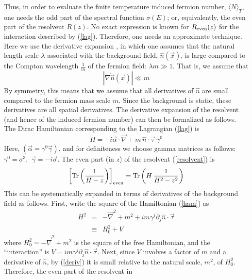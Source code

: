 \documentclass[a4paper,prd]{revtex4}
\begin{document}
Thus, in order to evaluate the finite temperature induced fermion
number,
$\langle N\rangle_T$, one needs the odd part of the spectral function
$\sigma(E)$; or, equivalently, the even part of the resolvent $ R(z)$. No
exact expression is known for 
$R_{\rm even}(z)$ for the interaction described by (\ref{lag}).
Therefore, one needs an approximate technique. Here we use the
derivative expansion \cite{ian}, in which one assumes that the natural
length scale $\lambda$ associated with the background field,
$\hat{n}(\vec{x})$, is large compared to the Compton wavelength
$\frac{1}{m}$ of the fermion field: $\lambda m \gg 1$. That is, we
assume that
\begin{equation}
|\vec{\nabla}\hat{n}(\vec{x})|\ll m
\label{deriv}
\end{equation}
By symmetry, this means that we assume that all derivatives of $\hat{n}$ are small
compared to the fermion mass scale $m$. Since the background is static,
these derivatives are all spatial derivatives. The derivative expansion
of the resolvent (and hence of the induced fermion number) can then be
formalized as follows. The Dirac Hamiltonian corresponding to the
Lagrangian (\ref{lag}) is
\begin{equation}
H=-i\vec{\alpha}\cdot \vec{\nabla}+m\, \hat{n}\cdot\vec{\tau}\,\gamma^{0}
\label{ham}
\end{equation}
Here, $(\vec{\alpha}=\gamma^{0}\vec{\gamma})$, and for definiteness we choose gamma
matrices as follows: $\gamma^{0}=\sigma^{3},\,\,
\vec{\gamma}=-i\vec{\sigma}$. The even part (in $z$) of the resolvent (\ref{resolvent})
is
\begin{equation}
\left[\textrm{Tr}\left(\frac{1}{H-z}\right)\right]_{\rm
even}=\textrm{Tr}\left(H\,\frac{1}{H^{2}-z^{2}}\right)
\label{evenres}
\end{equation}
This can be systematically expanded in terms of derivatives of the background field
as follows. First, write the square of the Hamiltonian (\ref{ham}) as
\begin{eqnarray}
H^2&=&-\vec{\nabla}^{2}+m^{2}+im\gamma^{j} \partial_j\hat{n}\cdot
\vec{\tau}\nonumber\\
&\equiv& H_0^{2}+V
\end{eqnarray}
where $H_0^{2}=-\vec{\nabla}^{2}+m^{2}$ is the square of the free
Hamiltonian, and the ``interaction'' is $V=im\gamma^{j}
\partial_j\hat{n}\cdot
\vec{\tau}$. Next, since $V$ involves a factor of $m$ and a derivative
of $\hat{n}$, by (\ref{deriv}) it is small relative to the natural
scale, $m^2$, of $H_0^2$. Therefore, the even part of the resolvent in
\end{document}
